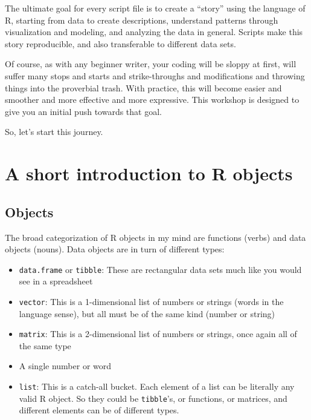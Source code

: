 \documentclass[12pt,letterpaperpaper,openany]{book}
\providecommand{\tightlist}{%
  \setlength{\itemsep}{0pt}\setlength{\parskip}{0pt}}
\begin{document}
The ultimate goal for every script file is to create a ``story'' using the language of R,
starting from data to create descriptions, understand patterns through visualization and modeling,
and analyzing the data in general. Scripts make this story reproducible, and also transferable to different data sets.

Of course, as with any beginner writer, your coding will be sloppy at first, will suffer many
stops and starts and strike-throughs and modifications and throwing things into the proverbial trash. With practice, this will become easier and smoother and more effective and more expressive. This workshop is designed to give you an initial push towards that goal.

So, let's start this journey.

\hypertarget{a-short-introduction-to-r-objects}{%
\section{A short introduction to R objects}\label{a-short-introduction-to-r-objects}}

\hypertarget{objects}{%
\subsection{Objects}\label{objects}}

The broad categorization of R objects in my mind are functions (verbs) and data objects (nouns).
Data objects are in turn of different types:

\begin{itemize}
\tightlist
\item
  \texttt{data.frame} or \texttt{tibble}: These are rectangular data sets much like you would see in a spreadsheet
\item
  \texttt{vector}: This is a 1-dimensional list of numbers or strings (words in the language sense), but all must be of the same kind (number or string)
\item
  \texttt{matrix}: This is a 2-dimensional list of numbers or strings, once again all of the same type
\item
  A single number or word
\item
  \texttt{list}: This is a catch-all bucket. Each element of a list can be literally any valid R object. So they could be \texttt{tibble}'s, or functions, or matrices, and different elements can be of different types.
\end{itemize}
\end{document}
